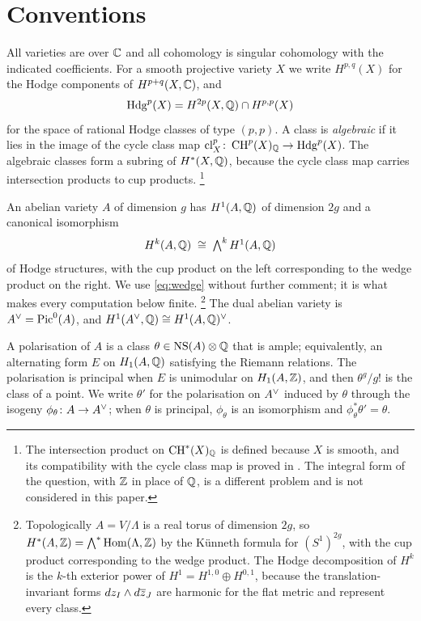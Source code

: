 \section{Conventions}\label{sec:conventions}
\enlargethispage{3pt}

All varieties are over $\mathbb{C}$ and all cohomology is singular cohomology with
the indicated coefficients. For a smooth projective variety $X$ we write
$H^{p,q}(X)$ for the Hodge components of $H^{p+q}(X,\mathbb{C})$, and
\[
  \mathrm{Hdg}^{p}(X)=H^{2p}(X,\mathbb{Q})\cap H^{p,p}(X)
\]
for the space of rational Hodge classes of type $(p,p)$. A class is
\emph{algebraic} if it lies in the image of the cycle class map
$\mathrm{cl}^{p}_{X}\colon\operatorname{CH}^{p}(X)_{\mathbb{Q}}\to\mathrm{Hdg}^{p}(X)$. The algebraic classes form
a subring of $H^{*}(X,\mathbb{Q})$, because the cycle class map carries intersection
products to cup products.%
\footnote{The intersection product on $\operatorname{CH}^{*}(X)_{\mathbb{Q}}$ is defined because
$X$ is smooth, and its compatibility with the cycle class map is proved in
\cite[Chapter~19]{Ful98}. The integral form of the question, with $\mathbb{Z}$ in
place of $\mathbb{Q}$, is a different problem and is not considered in this paper.}

An abelian variety $A$ of dimension $g$ has $H^{1}(A,\mathbb{Q})$ of dimension $2g$
and a canonical isomorphism
\begin{equation}\label{eq:wedge}
  H^{k}(A,\mathbb{Q})\;\cong\;\textstyle\bigwedge^{k}H^{1}(A,\mathbb{Q})
\end{equation}
of Hodge structures, with the cup product on the left corresponding to the
wedge product on the right. We use \eqref{eq:wedge} without further comment;
it is what makes every computation below finite.%
\footnote{Topologically $A=V/\Lambda$ is a real torus of dimension $2g$, so
$H^{*}(A,\mathbb{Z})=\bigwedge^{*}\operatorname{Hom}(\Lambda,\mathbb{Z})$ by the K\"unneth formula for
$(S^{1})^{2g}$, with the cup product corresponding to the wedge product. The
Hodge decomposition of $H^{k}$ is the $k$-th exterior power of
$H^{1}=H^{1,0}\oplus H^{0,1}$, because the translation-invariant forms
$dz_{I}\wedge d\overline{z}_{J}$ are harmonic for the flat metric and represent
every class.}
The dual abelian variety is $A^{\vee}=\operatorname{Pic}^{0}(A)$, and
$H^{1}(A^{\vee},\mathbb{Q})\cong H^{1}(A,\mathbb{Q})^{\vee}$.

A polarisation of $A$ is a class $\theta\in\mathrm{NS}(A)\otimes\mathbb{Q}$ that is ample;
equivalently, an alternating form $E$ on $H_{1}(A,\mathbb{Q})$ satisfying the Riemann
relations. The polarisation is principal when $E$ is unimodular on
$H_{1}(A,\mathbb{Z})$, and then $\theta^{g}/g!$ is the class of a point. We write
$\theta'$ for the polarisation on $A^{\vee}$ induced by $\theta$ through the
isogeny $\phi_{\theta}\colon A\to A^{\vee}$; when $\theta$ is principal,
$\phi_{\theta}$ is an isomorphism and $\phi_{\theta}^{*}\theta'=\theta$.


